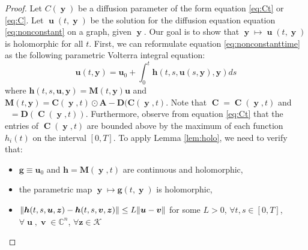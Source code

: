 \documentclass[12pt, oneside]{report}   	%
\newcommand{\C}{\mathbb{C}}
\DeclarePairedDelimiter{\norm}{\lVert}{\rVert}        %
\DeclareMathOperator{\CC}{\boldsymbol{C}}
\DeclareMathOperator{\DC}{\boldsymbol{D}(\boldsymbol{C})}
\DeclareMathOperator{\uu}{\boldsymbol{u}}
\DeclareMathOperator{\y}{\boldsymbol{y}}
\DeclareMathOperator{\vv}{\boldsymbol{v}}
\begin{document}
\begin{proof}
Let $C(\y)$ be a diffusion parameter of the form equation \eqref{eq:Ct} or \eqref{eq:C}. Let $\uu(t,\y)$ be the solution for the diffusion equation equation \eqref{eq:nonconstant} on a graph, given $\y$. Our goal is to show that $\y\mapsto\uu(t,\y)$ is holomorphic for all $t$. First, we can reformulate equation \eqref{eq:nonconstanttime} as the following parametric Volterra integral equation:
$$
\boldsymbol{u}(t,\boldsymbol{y})=\boldsymbol{u}_0 + \int_{0}^{t} \boldsymbol{h}(t,s,\boldsymbol{u}(s,\boldsymbol{y}),\boldsymbol{y}) ds
$$
where $\boldsymbol{h}(t,s,\boldsymbol{u},\boldsymbol{y})=\boldsymbol{M}(t,\boldsymbol{y})\boldsymbol{u}$ and $\boldsymbol{M}(t,\boldsymbol{y})=\boldsymbol{C}(\y,t) \odot \boldsymbol{A} - \boldsymbol{D}(\boldsymbol{C}(\y,t)$. Note that $\CC=\CC(\y,t)$ and $\DC=\boldsymbol{D}(\CC(\y,t))$. Furthermore, observe from equation \eqref{eq:Ct} that the entries of $\CC(\y,t)$ are bounded above by the maximum of each function $h_i(t)$ on the interval $[0,T]$. To apply Lemma \ref{lem:holo}, we need to verify that:
\begin{itemize}
\item $\boldsymbol{g}\equiv\boldsymbol{u}_0$ and $\boldsymbol{h}=\boldsymbol{M}(\y,t)$ are continuous and holomorphic,
\item the parametric map $\y\mapsto\boldsymbol{g}(t,\y)$ is holomorphic,
\item $\norm{\boldsymbol{h}(t,s,\boldsymbol{u},\boldsymbol{z}) - \boldsymbol{h}(t,s,\boldsymbol{v},\boldsymbol{z})} \leq L\norm{\boldsymbol{u}-\boldsymbol{v}}$ for some $L>0$, $\forall t,s\in[0,T]$, $\forall \uu,\vv\in\C^n$, $\forall\boldsymbol{z}\in\mathcal{K}$
\end{itemize}


\end{proof}
\end{document}
